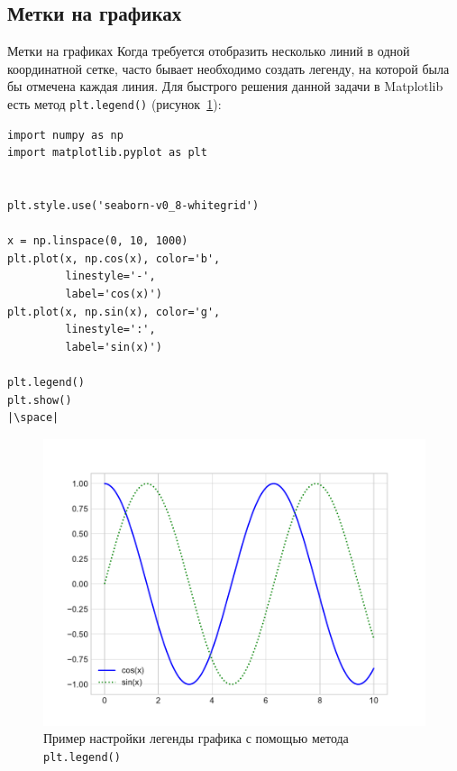 \documentclass[aspectratio=169, mathserif]{beamer}	%
\begin{document}
\subsection{Метки на графиках}
\begin{frame}[fragile, label=m]{Метки на графиках}
\scriptsize
Когда требуется отобразить несколько линий в одной координатной сетке, часто бывает необходимо создать легенду, на которой была бы отмечена каждая линия. Для быстрого решения данной задачи в Matplotlib есть метод \texttt{plt.legend()} (рисунок~\ref{fig:fig_12}):
\vfill
\begin{minipage}{.4\textwidth}
\begin{verbatim}
import numpy as np
import matplotlib.pyplot as plt


plt.style.use('seaborn-v0_8-whitegrid')

x = np.linspace(0, 10, 1000)
plt.plot(x, np.cos(x), color='b',
         linestyle='-',
         label='cos(x)')
plt.plot(x, np.sin(x), color='g',
         linestyle=':',
         label='sin(x)')

plt.legend()
plt.show()
|\space|
\end{verbatim}
\end{minipage}
\begin{minipage}{.59\textwidth}
\begin{figure}[h!]
	\centering
	\includegraphics[width=.85\linewidth]{./pics/Figure_12}
	\caption{Пример настройки легенды графика с помощью метода \texttt{plt.legend()}}
	\label{fig:fig_12}
\end{figure}
\end{minipage}
\vfill
\end{frame}
\end{document}
